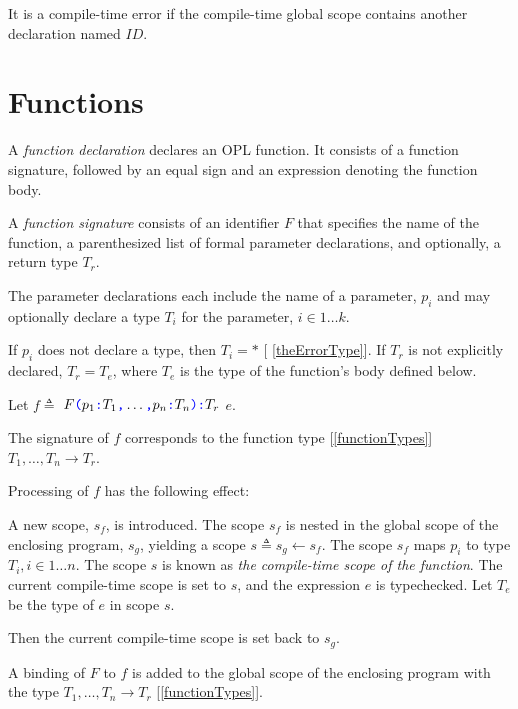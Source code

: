 \documentclass{article}
\begin{document}
It is a compile-time error if the compile-time global scope contains another declaration named $ID$. 

\section{Functions}
\label{functions}

A {\em function declaration} declares an OPL function. It consists of a function signature, followed by an equal sign and an expression denoting the function body.

\FunctionDeclaration{}

A {\em function signature} consists of an identifier $F$  that specifies the name of the function, a parenthesized list of formal parameter declarations, and optionally, a return type $T_r$. 

\FunctionSignature{}

The parameter declarations each include the name of a parameter, $p_i$ and may optionally declare a type $T_i$ for the parameter, $i \in 1 \ldots k$.

\ParameterList{}

\Parameter{}

If $p_i$ does not declare a type, then $T_i =  *$ [ \ref{theErrorType}]. If $T_r$ is not explicitly declared, $T_r = T_e$, where $T_e$ is  the type of the function's body defined below.

Let $f \triangleq$ \FUNC{} $F\texttt{\color{blue} (}{}p_1\texttt{\color{blue} :} T_1\texttt{\color{blue} ,}{} \ldots\texttt{\color{blue} ,}{} p_n\texttt{\color{blue} :} T_n\texttt{\color{blue} )}{}\texttt{\color{blue} :} T_r$  \BIND{} $e$.

The signature of $f$ corresponds to the function type [\ref{functionTypes}] $T_1, \ldots, T_n \to T_r$.

Processing of $f$  has the following effect:

A new scope, $s_{f}$, is introduced. The scope $s_{f}$ is nested in the global  scope of the enclosing program, $s_g$, yielding a scope $s \triangleq s_g \leftarrow s_{f}$. The scope $s_f$ maps $p_i$ to type $T_i, i \in 1 \ldots n$. The scope $s$ is known as {\em the compile-time scope of the function}.
The current compile-time scope is set to $s$, and the  expression $e$ is typechecked. Let $T_e$ be the type of $e$ in scope $s$.

Then the current compile-time scope is set back to $s_g$.

A binding of $F$ to $f$ is added to the global scope of the enclosing program with the type  $T_1, \ldots, T_n \to T_r$ [\ref{functionTypes}]. 
\end{document}
